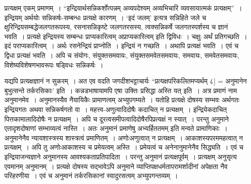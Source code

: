 {प्रत्यक्षम् एकम् प्रमाणम्~। “इन्द्रियार्थसन्निकर्शोत्पन्नम् अव्यपदेश्यम् अव्यभिचारि व्यवसायात्मकं प्रत्यक्षम्”~। इन्द्रियम् अर्थयोः सन्निकर्षः-सम्बन्धः प्रत्यक्षे कारणम्~। ‘इदं जलम्’ इत्यत्र सन्निहिते जले च क्षुरिन्द्रियसम्बद्धेजलगतरूपस्य, रसनासन्निकृष्टे जलगतरसस्य, त्वक्सन्निकर्षे जलगतस्पर्शस्य च ज्ञानं भवति~। प्रत्यक्षे इन्द्रियस्य सम्बन्धः प्राप्यकारित्वम् अप्राप्यकारित्वम् इति द्विविधः~। चक्षुः अर्थं प्रतिगच्छति~। इदं पराप्यकारित्वम्~। अर्थः रसनेन्द्रियं प्राप्नोति~। इन्द्रियं न गच्छति~। अथापि प्रत्यक्षं भवति~। एवं च द्विधा प्रत्यक्षं भवति~। अपि च संयोगः, संयुक्तसमवायः, संयुक्तसमवेतसमवायः, समवायः, समवेतसमवायः, विशेष्यविशेषणभावरूपः षड्विधः सन्निकर्षः~। 

यद्यपि प्रत्यक्षज्ञानं न सुकरम्~। अत एव वदति जगदीशभट्टाचार्यः “प्रत्यक्षपरिकलितमप्यर्थम् ८] = अनुमानेन बुभुत्सन्ते तर्करसिकाः’ इति~। कन्नडभाषायामपि एषा उक्तिः प्रसिद्धा अस्ति यत् {\fontsize{14}{16}\selectfont {}} इति~। अत्र प्रमाणं नाम अनुमानमेव~। अनुमानस्यैव नैयायिकैः प्रामाणत्वम् अभ्युपगम्यते~। यतोहि प्रत्यक्षे दोषस्य सम्भवः अर्थगतः इन्द्रियगतः अथवा सन्निकर्षगतो वा~। महत्त्व-अणुत्वादिदोषैः कदाचित् न प्रत्यक्षम्~। इन्द्रियेकदाचित् पित्तकामालादिदोषैः न प्रत्यक्षम्~। अपि च दूरत्वसमीपत्वादिदोषैरपिप्रत्यक्षं न स्यात्~। परन्तु अनुमाने एतादृशदोषाणां सम्भाव्यत्वं नास्ति~। अतः अनुमानं प्रमाणेषु अभ्यर्हिततमम् इति मन्वते प्रामाणिकाः~। अनुमानेनैव न्यायशास्त्रस्य शास्त्रत्वं प्रमाणितम्~। अणोःअणुत्वात् न प्रत्यक्षम्~। आकाशस्यपरममहत्वात् न प्रत्यक्षम्~। अपि तु अणोःआकाशस्य च प्रमेयत्वम् अस्ति~। प्रमेयत्वं च अनेनानुमानेनैव सिद्ध्यति~। एवं च इन्द्रियाजन्यज्ञाने अनुमानस्य आवश्यकताप्रतिपादिता~। परन्तु अनुमानं प्रत्यक्षपूर्वम्~। प्रत्यक्षम् अनुसृत्य एवमानम् अनुमानम्~। प्रत्यक्षे दोषस्य सद्भावेऽपि अनुमाने व्याप्तिपक्षधर्मतापरामर्शादीनां अपेक्षता नैव परिहरणीया~। एवं च अनुमानं तर्करसिकानां स्वादुरसत्वम् अभ्युपगन्तव्यम्~। 

\articleend
}
